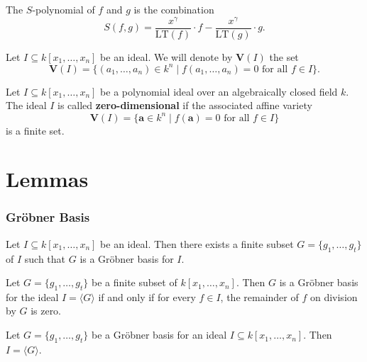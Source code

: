 \begin{definition}\label{S Polynomial}
  \leanok
  The $S$-polynomial of $f$ and $g$ is the combination
  \[
  S(f, g) = \frac{x^\gamma}{\mathrm{LT}(f)} \cdot f - \frac{x^\gamma}{\mathrm{LT}(g)} \cdot g.
  \]
\end{definition}

\begin{definition}\label{Variety}
  Let \( I \subseteq k[x_1, \ldots, x_n] \) be an ideal. We will denote by \( \mathbf{V}(I) \) the set
  \[
  \mathbf{V}(I) = \{(a_1, \ldots, a_n) \in k^n \mid f(a_1, \ldots, a_n) = 0 \text{ for all } f \in I\}.
  \]
\end{definition}

\begin{definition}\label{Zerodimensional Ideal}
  Let \( I \subseteq k[x_1, \ldots, x_n] \) be a polynomial ideal over an algebraically closed field \( k \).
  The ideal \( I \) is called \textbf{zero-dimensional} if the associated affine variety
  \[
  \mathbf{V}(I) = \{\mathbf{a} \in k^n \mid f(\mathbf{a}) = 0 \text{ for all } f \in I\}
  \]
  is a finite set.
  \end{definition}

\chapter{Lemmas}
\subsection{Gröbner Basis}
\begin{lemma}\label{exists_groebner_basis}
  Let \( I \subseteq k[x_1, \ldots, x_n] \) be an ideal. Then there exists a finite subset \( G = \{g_1, \ldots, g_t\} \) of \( I \) such that \( G \) is a Gröbner basis for \( I \).
\end{lemma}

\begin{lemma}\label{is_groebner_basis_iff}
  Let \( G = \{g_1, \ldots, g_t\} \) be a finite subset of \( k[x_1, \ldots, x_n] \). Then \( G \) is a Gröbner basis for the ideal \( I = \langle G \rangle \) if and only if  for every \( f \in I \), the remainder of \( f \) on division by \( G \) is zero.
\end{lemma}

\begin{lemma}\label{groebner_basis_is_ideal}
  Let \( G = \{g_1, \ldots, g_t\} \) be a Gröbner basis for an ideal \( I \subseteq k[x_1, \ldots, x_n] \). Then \( I = \langle G \rangle \).
\end{lemma}

